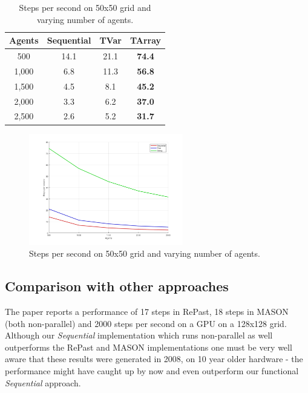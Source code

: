 \begin{table}
	\centering
  	\begin{tabular}{ c || c | c | c }
        Agents  & Sequential & TVar       & TArray        \\ \hline \hline 
    	500     & 14.1       & 21.1       & \textbf{74.4} \\ \hline
   		1,000   & 6.8        & 11.3       & \textbf{56.8} \\ \hline
   		1,500   & 4.5        & 8.1        & \textbf{45.2} \\ \hline
   		2,000   & 3.3        & 6.2        & \textbf{37.0} \\ \hline 
   		2,500   & 2.6        & 5.2        & \textbf{31.7}
   	\end{tabular}
  	
  	\caption{Steps per second on 50x50 grid and varying number of agents.}
	\label{tab:state_results_agentsscale_time}
\end{table}

\begin{figure}
	\centering
	\includegraphics[width=0.6\textwidth, angle=0]{./fig/sugarscape/agents_performance.png}
	\caption{Steps per second on 50x50 grid and varying number of agents.}
	\label{fig:state_results_agentsscale_time}
\end{figure}

\subsection{Comparison with other approaches}
The paper \cite{lysenko_framework_2008} reports a performance of 17 steps in RePast, 18 steps in MASON (both non-parallel) and 2000 steps per second on a GPU on a 128x128 grid. Although our \textit{Sequential} implementation which runs non-parallel as well outperforms the RePast and MASON implementations one must be very well aware that these results were generated in 2008, on 10 year older hardware - the performance might have caught up by now and even outperform our functional \textit{Sequential} approach. 

